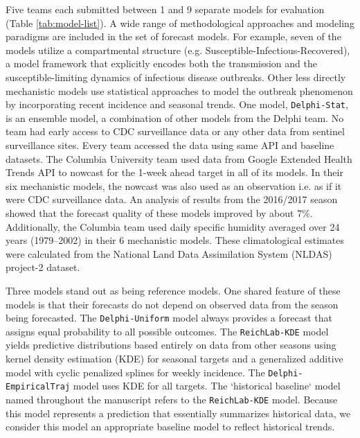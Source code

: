 \documentclass[9pt,twocolumn,twoside]{pnas-new}\usepackage[]{graphicx}\usepackage[]{color}
\begin{document}
{Five teams each submitted between 1 and 9 separate models for evaluation (Table \ref{tab:model-list}). 
A wide range of methodological approaches and modeling paradigms are included in the set of forecast models.
For example, seven of the models utilize a compartmental structure (e.g. Susceptible-Infectious-Recovered), a model framework that explicitly encodes both the transmission and the susceptible-limiting dynamics of infectious disease outbreaks.
Other less directly mechanistic models use statistical approaches to model the outbreak phenomenon by incorporating recent incidence and seasonal trends.
One model, {\tt Delphi-Stat}, is an ensemble model, a combination of other models from the Delphi team.
No team had early access to CDC surveillance data  or any other data from sentinel surveillance sites. Every team accessed the data using same API and baseline datasets.
The Columbia University team used data from Google Extended Health Trends API to nowcast for the 1-week ahead target in all of its models. In their six mechanistic models, the nowcast was also used as an observation i.e. as if it were CDC surveillance data. An analysis of results from the 2016/2017 season showed that the forecast quality of these models improved by about 7\%.\cite{Kandula2018} 
Additionally, the Columbia team used daily specific humidity averaged over 24 years (1979–2002) in their 6 mechanistic models. These climatological estimates were calculated from the National Land Data Assimilation System (NLDAS) project-2 dataset.

Three models stand out as being reference models. 
One shared feature of these models is that their forecasts do not depend on observed data from the season being forecasted. 
The {\tt Delphi-Uniform} model always provides a forecast that assigns equal probability to all possible outcomes. 
The {\tt ReichLab-KDE} model yields predictive distributions based entirely on data from other seasons using kernel density estimation (KDE) for seasonal targets and a generalized additive model with cyclic penalized splines for weekly incidence.
The {\tt Delphi-EmpiricalTraj} model uses KDE for all targets.
The `historical baseline` model named throughout the manuscript refers to the {\tt ReichLab-KDE} model.
Because this model represents a prediction that essentially summarizes historical data, we consider this model an appropriate baseline model to reflect historical trends.

}
\end{document}
